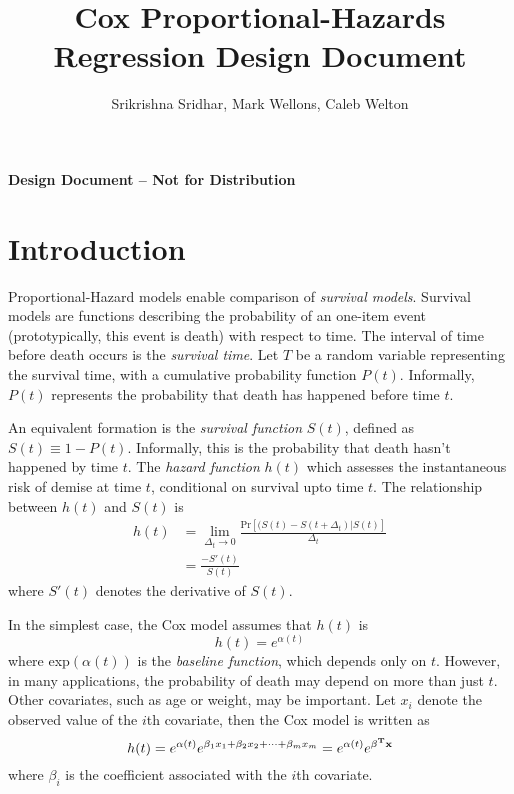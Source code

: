 \documentclass[12pt]{article}
\author{Srikrishna Sridhar, Mark Wellons, Caleb Welton}
\title{Cox Proportional-Hazards Regression Design Document}
\begin{document}
\maketitle
\large
\begin{center}
{\sc \bf Design Document -- Not for Distribution}
\end{center}
\normalsize

\section{Introduction}
Proportional-Hazard models\cite{cox} enable comparison of \textit{survival models}. Survival models are functions describing the probability of an one-item event (prototypically, this event is death) with respect to time.  The interval of time before death occurs is the \textit{survival time}.   Let $T$ be a random variable representing the survival time, with a cumulative probability function $P(t)$.  Informally, $P(t)$ represents the probability that death has happened before time $t$.  

An equivalent formation is the \textit{survival function} $S(t)$, defined as $S(t) \equiv 1 - P(t)$.  Informally, this is the probability that death hasn't happened by time $t$.  The \textit{hazard function} $h(t)$ which assesses the instantaneous risk of demise at time $t$, conditional on survival upto time $t$.  The relationship between $h(t)$ and $S(t)$ is 
\begin{align}
h(t) &= \lim_{\Delta_t \rightarrow 0}  \frac{\mbox{Pr}[(S(t) - S(t + \Delta_t) | S(t) ]}{\Delta_t}\\
& = \frac{-S'(t)}{S(t)}
\end{align}
where $S'(t)$ denotes the derivative of $S(t)$.

In the simplest case, the Cox model assumes that $h(t)$ is
\begin{equation}
h(t) = e^{\alpha(t)}
\end{equation}
where exp$(\alpha(t))$ is the \textit{baseline function}, which depends only on $t$.  However, in many applications, the probability of death may depend on more than just $t$.  Other covariates, such as age or weight, may be important.  Let $x_i$ denote the observed value of the  $i$th covariate, then the Cox model is written as 
\begin{equation}
h(t) = e^{\alpha(t)} e^{\beta_1 x_1 + \beta_2 x_2 + \dots + \beta_m x_m} = e^{\alpha(t)} e^{\bold{\beta^T x}}
\end{equation}
where $\beta_i$ is the coefficient associated with the $i$th covariate.  
\end{document}
